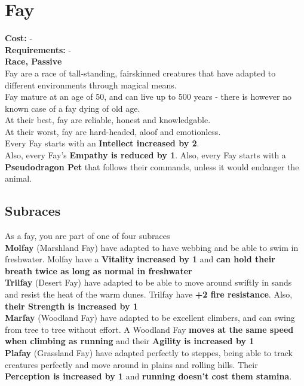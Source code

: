 \section{Fay}
\textbf{Cost:} -\\
\textbf{Requirements:} -\\
\textbf{Race, Passive}\\
Fay are a race of tall-standing, fairskinned creatures that have adapted to different environments through magical means.\\
Fay mature at an age of 50, and can live up to 500 years - there is however no known case of a fay dying of old age.\\
At their best, fay are reliable, honest and knowledgable.\\
At their worst, fay are hard-headed, aloof and emotionless.\\
Every Fay starts with an \textbf{Intellect increased by 2}.\\
Also, every Fay's \textbf{Empathy is reduced by 1}.
Also, every Fay starts with a \textbf{Pseudodragon Pet} that follows their commands, unless it would endanger the animal.
\\ 
\subsection{Subraces}
As a fay, you are part of one of four subraces\\

\textbf{Molfay} (Marshland Fay) have adapted to have webbing and be able to swim in freshwater. Molfay have a \textbf{Vitality increased by 1} and \textbf{can hold their breath twice as long as normal in freshwater}\\


\textbf{Trilfay} (Desert Fay) have adapted to be able to move around swiftly in sands and resist the heat of the warm dunes. Trilfay have \textbf{+2 fire resistance}. Also, \textbf{their Strength is increased by 1}\\


\textbf{Marfay} (Woodland Fay) have adapted to be excellent climbers, and can swing from tree to tree without effort. A Woodland Fay \textbf{moves at the same speed when climbing as running} and their \textbf{Agility is increased by 1}\\


\textbf{Plafay} (Grassland Fay) have adapted perfectly to steppes, being able to track creatures perfectly and move around in plains and rolling hills. Their \textbf{Perception is increased by 1} and \textbf{running doesn't cost them stamina}.\\